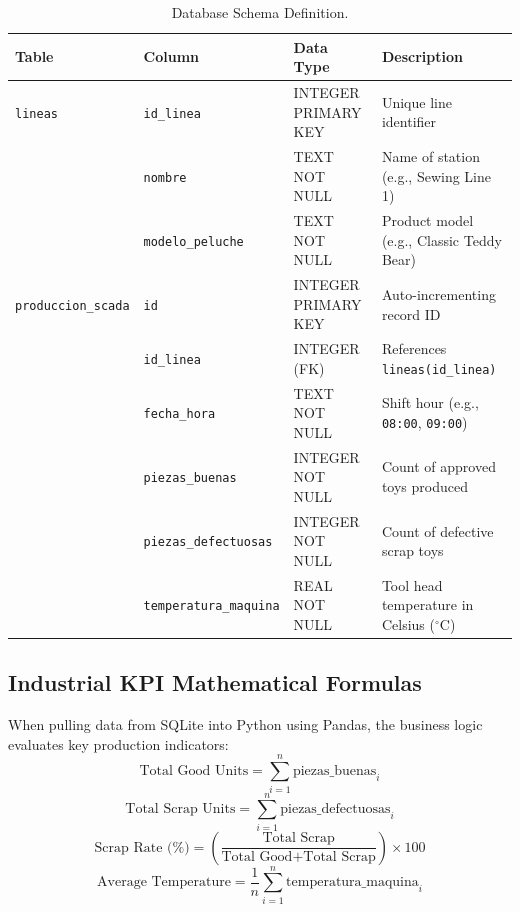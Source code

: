 \documentclass[11pt,letterpaper]{article}
\begin{document}
\begin{table}[h!]
\centering
\small
\begin{tabular}{llll}
\toprule
\textbf{Table} & \textbf{Column} & \textbf{Data Type} & \textbf{Description} \\
\midrule
\texttt{lineas} & \texttt{id\_linea} & INTEGER PRIMARY KEY & Unique line identifier \\
 & \texttt{nombre} & TEXT NOT NULL & Name of station (e.g., Sewing Line 1) \\
 & \texttt{modelo\_peluche} & TEXT NOT NULL & Product model (e.g., Classic Teddy Bear) \\
\midrule
\texttt{produccion\_scada} & \texttt{id} & INTEGER PRIMARY KEY & Auto-incrementing record ID \\
 & \texttt{id\_linea} & INTEGER (FK) & References \texttt{lineas(id\_linea)} \\
 & \texttt{fecha\_hora} & TEXT NOT NULL & Shift hour (e.g., \texttt{08:00}, \texttt{09:00}) \\
 & \texttt{piezas\_buenas} & INTEGER NOT NULL & Count of approved toys produced \\
 & \texttt{piezas\_defectuosas} & INTEGER NOT NULL & Count of defective scrap toys \\
 & \texttt{temperatura\_maquina} & REAL NOT NULL & Tool head temperature in Celsius ($^\circ\text{C}$) \\
\bottomrule
\end{tabular}
\caption{Database Schema Definition.}
\end{table}

\subsection{Industrial KPI Mathematical Formulas}
When pulling data from SQLite into Python using Pandas, the business logic evaluates key production indicators:
\begin{equation}
\text{Total Good Units} = \sum_{i=1}^{n} \text{piezas\_buenas}_i
\end{equation}
\begin{equation}
\text{Total Scrap Units} = \sum_{i=1}^{n} \text{piezas\_defectuosas}_i
\end{equation}
\begin{equation}
\text{Scrap Rate (\%)} = \left( \frac{\text{Total Scrap}}{\text{Total Good} + \text{Total Scrap}} \right) \times 100
\end{equation}
\begin{equation}
\text{Average Temperature} = \frac{1}{n} \sum_{i=1}^{n} \text{temperatura\_maquina}_i
\end{equation}
\end{document}
